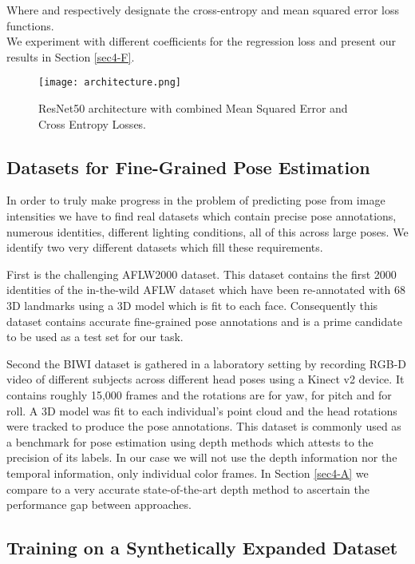 \documentclass[10pt,twocolumn,letterpaper]{article}
\begin{document}
Where  and  respectively designate the cross-entropy and mean squared error loss functions.\\

We experiment with different coefficients for the regression loss and present our results in Section \ref{sec4-F}.

\begin{figure*}
  \texttt{[image: architecture.png]}
  \caption{ResNet50 architecture with combined Mean Squared Error and Cross Entropy Losses.}
  \label{architecture}
\end{figure*}

\subsection{Datasets for Fine-Grained Pose Estimation}\label{sec3-C}

In order to truly make progress in the problem of predicting pose from image intensities we have to find real datasets which contain precise pose annotations, numerous identities, different lighting conditions, all of this across large poses. We identify two very different datasets which fill these requirements.

First is the challenging AFLW2000 dataset. This dataset contains the first 2000 identities of the in-the-wild AFLW dataset which have been re-annotated with 68 3D landmarks using a 3D model which is fit to each face. Consequently this dataset contains accurate fine-grained pose annotations and is a prime candidate to be used as a test set for our task.

Second the BIWI dataset is gathered in a laboratory setting by recording RGB-D video of different subjects across different head poses using a Kinect v2 device. It contains roughly 15,000 frames and the rotations are  for yaw,  for pitch and  for roll. A 3D model was fit to each individual's point cloud and the head rotations were tracked to produce the pose annotations. This dataset is commonly used as a benchmark for pose estimation using depth methods which attests to the precision of its labels. In our case we will not use the depth information nor the temporal information, only individual color frames. In Section \ref{sec4-A} we compare to a very accurate state-of-the-art depth method to ascertain the performance gap between approaches.

\subsection{Training on a Synthetically Expanded Dataset}\label{sec3-D}
\end{document}
